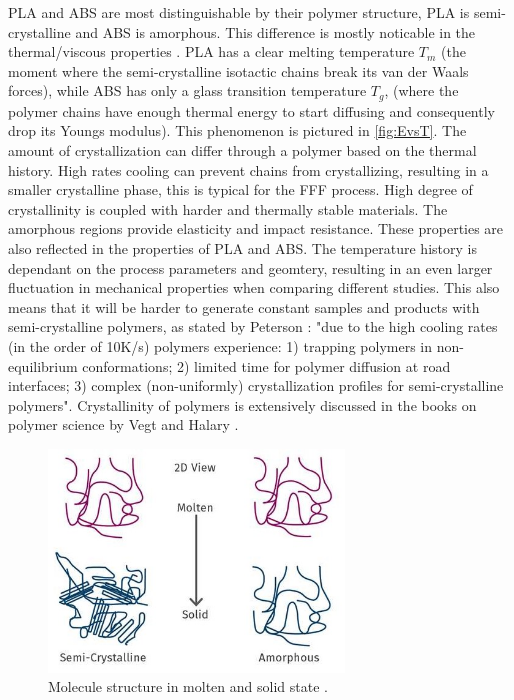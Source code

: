 PLA and ABS are most distinguishable by their polymer structure,  PLA is semi-crystalline and ABS is amorphous. This difference is mostly noticable in the thermal/viscous properties \cite{Rodriguez-Panes2018TheAnalysis}. PLA has a clear melting temperature $T_m$ (the moment where the semi-crystalline isotactic chains break its van der Waals forces), while ABS has only a glass transition temperature $T_g$, (where the polymer chains have enough thermal energy to start diffusing and consequently drop its Youngs modulus). This phenomenon is pictured in \ref{fig:EvsT}. The amount of crystallization can differ through a polymer based on the thermal history. High rates cooling can prevent chains from crystallizing, resulting in a smaller crystalline phase, this is typical for the FFF process. High degree of crystallinity is coupled with harder and thermally stable materials\cite{Balani2015PhysicalPolymers}. The amorphous regions provide elasticity and impact resistance. These properties are also reflected in the properties of PLA and ABS. The temperature history is dependant on the process parameters and geomtery, resulting in an even larger fluctuation in mechanical properties when comparing different studies. This also means that it will be harder to generate constant samples and products with semi-crystalline polymers, as stated by Peterson \cite{Peterson2019ReviewPerspective}: "due to the high cooling rates (in the order of 10K/s) polymers experience: 1) trapping polymers in non-equilibrium conformations; 2) limited time for polymer diffusion at road interfaces; 3) complex (non-uniformly) crystallization profiles for semi-crystalline polymers".  Crystallinity of polymers is extensively discussed in the books on polymer science by Vegt \cite{Van_der_Vegt2001FromPlastics} and Halary \cite{Halary2011PolymerMaterials}.

\begin{figure}[htb]
    \centering
    \includegraphics[width=0.7\textwidth]{chapter_2/figures/structurepolymers.PNG}
    \caption{Molecule structure in molten and solid state \cite{PtolinePolymersCrystalline}.}
    \label{fig:structurepolymers}
\end{figure}

